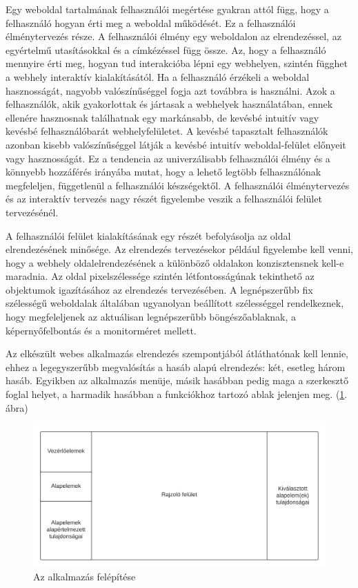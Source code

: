 
Egy weboldal tartalmának felhasználói megértése gyakran attól függ, hogy a felhasználó hogyan érti meg a weboldal működését. Ez a felhasználói élménytervezés része. A felhasználói élmény  egy weboldalon az elrendezéssel, az egyértelmű utasításokkal és a címkézéssel függ össze. Az, hogy a felhasználó mennyire érti meg, hogyan tud interakcióba lépni egy webhelyen, szintén függhet a webhely interaktív kialakításától. Ha a felhasználó érzékeli a weboldal hasznosságát, nagyobb valószínűséggel fogja azt továbbra is használni. Azok a felhasználók, akik gyakorlottak és jártasak a webhelyek használatában, ennek ellenére hasznosnak találhatnak egy markánsabb, de kevésbé intuitív vagy kevésbé felhasználóbarát webhelyfelületet. A kevésbé tapasztalt felhasználók azonban kisebb valószínűséggel látják a kevésbé intuitív weboldal-felület előnyeit vagy hasznosságát. Ez a tendencia az univerzálisabb felhasználói élmény és a könnyebb hozzáférés irányába mutat, hogy a lehető legtöbb felhasználónak megfeleljen, függetlenül a felhasználói készségektől. A felhasználói élménytervezés és az interaktív tervezés nagy részét figyelembe veszik a felhasználói felület tervezésénél.


A felhasználói felület kialakításának egy részét befolyásolja az oldal elrendezésének minősége. Az elrendezés tervezésekor például figyelembe kell venni, hogy a webhely oldalelrendezésének a különböző oldalakon konzisztensnek kell-e maradnia. Az oldal pixelszélessége szintén létfontosságúnak tekinthető az objektumok igazításához az elrendezés tervezésében. A legnépszerűbb fix szélességű weboldalak általában ugyanolyan beállított szélességgel rendelkeznek, hogy megfeleljenek az aktuálisan legnépszerűbb böngészőablaknak, a képernyőfelbontás és a monitorméret mellett.

Az elkészült webes alkalmazás elrendezés szempontjából átláthatónak kell lennie, ehhez a legegyszerűbb megvalósítás a hasáb alapú elrendezés: két, esetleg három hasáb. Egyikben az alkalmazás menüje, másik hasábban pedig maga a szerkesztő foglal helyet, a harmadik hasábban a funkciókhoz tartozó ablak jelenjen meg. (\ref{fig:block}. ábra)

\begin{figure}[!h]
	\centering
	\includegraphics[width=\textwidth]{images/block.png}
	\caption{Az alkalmazás felépítése}
	\label{fig:block}
\end{figure}


